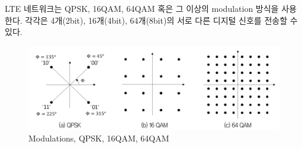 LTE 네트워크는 QPSK, 16QAM, 64QAM 혹은 그 이상의 modulation 방식을 사용한다. 각각은 4개(2bit), 16개(4bit), 64개(8bit)의 서로 다른 디지털 신호를 전송할 수 있다. \\
\vspace{-4mm}  
\begin{figure}[!h]\centering
	\includegraphics[width=.7\textwidth]{image/week11/2-2.png}
	\caption{\small Modulations, QPSK, 16QAM, 64QAM}
	\vspace{-10pt}
\end{figure}
\newpage